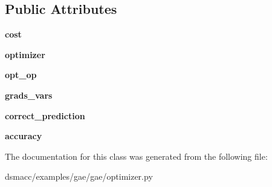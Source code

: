 \subsection*{Public Attributes}
\begin{DoxyCompactItemize}
\item 
\mbox{\label{classgae_1_1optimizer_1_1OptimizerAE_ab7d3c90e808d65928fc8d259dc473f10}} 
{\bfseries cost}
\item 
\mbox{\label{classgae_1_1optimizer_1_1OptimizerAE_af8a36dbe193df93a6020724b96002205}} 
{\bfseries optimizer}
\item 
\mbox{\label{classgae_1_1optimizer_1_1OptimizerAE_a00c1280535ef45f3f6431bd917901fb1}} 
{\bfseries opt\+\_\+op}
\item 
\mbox{\label{classgae_1_1optimizer_1_1OptimizerAE_a62895d759b7233a8a4ae59b184718c81}} 
{\bfseries grads\+\_\+vars}
\item 
\mbox{\label{classgae_1_1optimizer_1_1OptimizerAE_a591b27a129c1ef303cf1e4158eff71b8}} 
{\bfseries correct\+\_\+prediction}
\item 
\mbox{\label{classgae_1_1optimizer_1_1OptimizerAE_a2230ab2ddc8290c04f3d0575ee361140}} 
{\bfseries accuracy}
\end{DoxyCompactItemize}


The documentation for this class was generated from the following file\+:\begin{DoxyCompactItemize}
\item 
dsmacc/examples/gae/gae/optimizer.\+py\end{DoxyCompactItemize}
